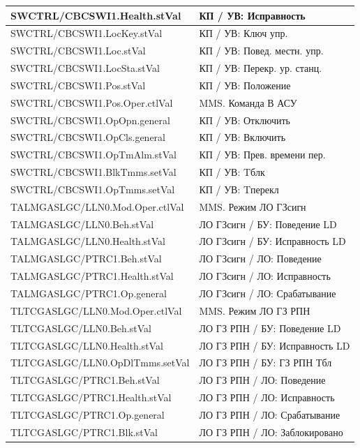 \begin{longtable}{|>{\raggedright\arraybackslash}m{}|>{\raggedright\arraybackslash}m{}|}
\hline
SWCTRL/CBCSWI1.Health.stVal & КП / УВ: Исправность \\
\hline
SWCTRL/CBCSWI1.LocKey.stVal & КП / УВ: Ключ упр. \\
\hline
SWCTRL/CBCSWI1.Loc.stVal & КП / УВ: Повед. местн. упр. \\
\hline
SWCTRL/CBCSWI1.LocSta.stVal & КП / УВ: Перекр. ур. станц. \\
\hline
SWCTRL/CBCSWI1.Pos.stVal & КП / УВ: Положение \\
\hline
SWCTRL/CBCSWI1.Pos.Oper.ctlVal & MMS. Команда В АСУ \\
\hline
SWCTRL/CBCSWI1.OpOpn.general & КП / УВ: Отключить \\
\hline
SWCTRL/CBCSWI1.OpCls.general & КП / УВ: Включить \\
\hline
SWCTRL/CBCSWI1.OpTmAlm.stVal & КП / УВ: Прев. времени пер. \\
\hline
SWCTRL/CBCSWI1.BlkTmms.setVal & КП / УВ: Tблк \\
\hline
SWCTRL/CBCSWI1.OpTmms.setVal & КП / УВ: Tперекл \\
\hline
TALMGASLGC/LLN0.Mod.Oper.ctlVal & MMS. Режим ЛО ГЗсигн \\
\hline
TALMGASLGC/LLN0.Beh.stVal & ЛО ГЗсигн / БУ: Поведение LD \\
\hline
TALMGASLGC/LLN0.Health.stVal & ЛО ГЗсигн / БУ: Исправность LD \\
\hline
TALMGASLGC/PTRC1.Beh.stVal & ЛО ГЗсигн / ЛО: Поведение \\
\hline
TALMGASLGC/PTRC1.Health.stVal & ЛО ГЗсигн / ЛО: Исправность \\
\hline
TALMGASLGC/PTRC1.Op.general & ЛО ГЗсигн / ЛО: Срабатывание \\
\hline
TLTCGASLGC/LLN0.Mod.Oper.ctlVal & MMS. Режим ЛО ГЗ РПН \\
\hline
TLTCGASLGC/LLN0.Beh.stVal & ЛО ГЗ РПН / БУ: Поведение LD \\
\hline
TLTCGASLGC/LLN0.Health.stVal & ЛО ГЗ РПН / БУ: Исправность LD \\
\hline
TLTCGASLGC/LLN0.OpDlTmms.setVal & ЛО ГЗ РПН / БУ: ГЗ РПН Тбл \\
\hline
TLTCGASLGC/PTRC1.Beh.stVal & ЛО ГЗ РПН / ЛО: Поведение \\
\hline
TLTCGASLGC/PTRC1.Health.stVal & ЛО ГЗ РПН / ЛО: Исправность \\
\hline
TLTCGASLGC/PTRC1.Op.general & ЛО ГЗ РПН / ЛО: Срабатывание \\
\hline
TLTCGASLGC/PTRC1.Blk.stVal & ЛО ГЗ РПН / ЛО: Заблокировано \\

\end{longtable}
